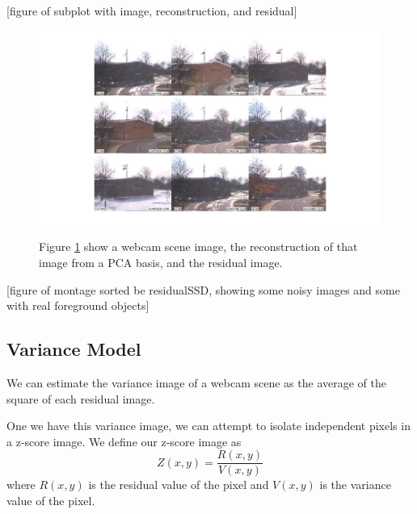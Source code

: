 [figure of subplot with image, reconstruction, and residual]

\begin{figure}
	\centering
		\includegraphics[width=1\textwidth]{figures/residualSSDmontage.jpg}
	\label{fig:residualSSDmontage}
	
		\caption[Residual SSD Montage.]{Figure \ref{fig:residualSSDmontage} show a webcam scene image, the reconstruction of that image from a PCA basis, and the residual image.}
\end{figure}

[figure of montage sorted be residualSSD, showing some noisy images and some with real foreground objects]


\subsection{Variance Model}

We can estimate the variance image of a webcam scene as the average of the square of each residual image.

One we have this variance image, we can attempt to isolate independent pixels in a z-score image.  We define our z-score image as $$Z(x,y) = \frac{R(x,y)} { V(x,y)}$$ where $R(x,y)$ is the residual value of the pixel and $V(x,y)$ is the variance value of the pixel.

